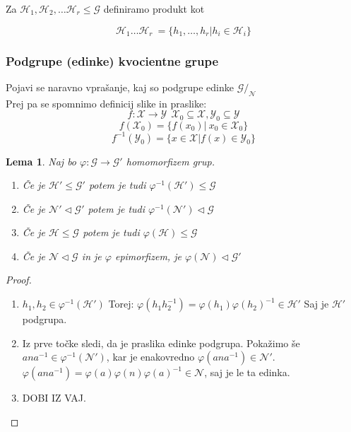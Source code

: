 \documentclass[a4paper]{article}
\newtheorem{lemma}{Lema}
\begin{document}
Za $\mathcal{H}_1, \mathcal{H}_2, \dots \mathcal{H}_r \leq \mathcal{G}$ definiramo produkt kot

$$
\mathcal{H}_1 \dots\mathcal{H}_r \:= \{h_1, \dots, h_r | h_i \in \mathcal{H}_i \}
$$

\subsubsection{Podgrupe (edinke) kvocientne grupe}

Pojavi se naravno vprašanje, kaj so podgrupe edinke $\mathcal{G}/_{\mathcal{N}}$\\
Prej pa se spomnimo definicij slike in praslike:
$$f: \mathcal{X} \to \mathcal{Y} \ \ \mathcal{X}_0 \subseteq \mathcal{X}, \mathcal{Y}_0 \subseteq \mathcal{Y}$$
$$f(\mathcal{X}_0) = \{ f(x_0) | \ x_0 \in \mathcal{X}_0\}$$
$$f^{-1}(\mathcal{Y}_0) = \{ x \in \mathcal{X} | f(x) \in \mathcal{Y}_0\}$$


\begin{lemma}
Naj bo $\varphi :\mathcal{G} \to \mathcal{G}'$ homomorfizem grup.
\begin{enumerate}
\item Če je $\mathcal{H}' \leq \mathcal{G}'$ potem je tudi $\varphi^{-1}(\mathcal{H}') \leq \mathcal{G}$
\item Če je $\mathcal{N}' \triangleleft \mathcal{G}'$ potem je tudi $\varphi^{-1}(\mathcal{N}') \triangleleft \mathcal{G}$
\item Če je $\mathcal{H} \leq \mathcal{G}$ potem je tudi $\varphi(\mathcal{H}) \leq \mathcal{G}$
\item Če je $\mathcal{N} \triangleleft \mathcal{G}$ in je $\varphi$ epimorfizem, je $\varphi(\mathcal{N}) \triangleleft \mathcal{G}'$
\end{enumerate}
\end{lemma}

\begin{proof}\leavevmode
\begin{enumerate}
\item $h_1, h_2 \in \varphi^{-1}(\mathcal{H}')$ Torej: $\varphi(h_1h_2^{-1}) = \varphi(h_1) \varphi(h_2)^{-1} \in \mathcal{H}'$ Saj je $\mathcal{H}'$ podgrupa.
\item Iz prve točke sledi, da je praslika edinke podgrupa. Pokažimo še $ana^{-1} \in \varphi^{-1}(\mathcal{N}')$, kar je enakovredno $\varphi(ana^{-1}) \in \mathcal{N}'$. $\varphi(ana^{-1}) = \varphi(a) \varphi(n) \varphi(a)^{-1} \in \mathcal{N}$, saj je le ta edinka.
\item DOBI IZ VAJ.

\end{enumerate}
\end{proof}
\end{document}
